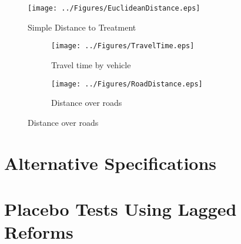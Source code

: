 \documentclass[12pt,subeqn]{article}
\begin{document}
\begin{spacing}{1.4}
\begin{figure}[htpb!]
\texttt{[image: ../Figures/EuclideanDistance.eps]}
\caption{Simple Distance to Treatment}
\label{dist}
\end{figure}


\begin{figure}[htpb!]
\begin{center}
\caption{Alternative Measures of Distance to Treatment}
\label{altdist}
\begin{subfigure}{.5\textwidth}
  \centering
  \texttt{[image: ../Figures/TravelTime.eps]}
  \caption{Travel time by vehicle}
  \label{travelTime}
\end{subfigure}%
\begin{subfigure}{.5\textwidth}
  \centering
  \texttt{[image: ../Figures/RoadDistance.eps]}
  \caption{Distance over roads}
  \label{roadDist}
\end{subfigure}
\end{center}
\vspace{-4mm}
\end{figure}


\clearpage
\section{Alternative Specifications}



\clearpage
\section{Placebo Tests Using Lagged Reforms}









\end{spacing}
\end{document}
